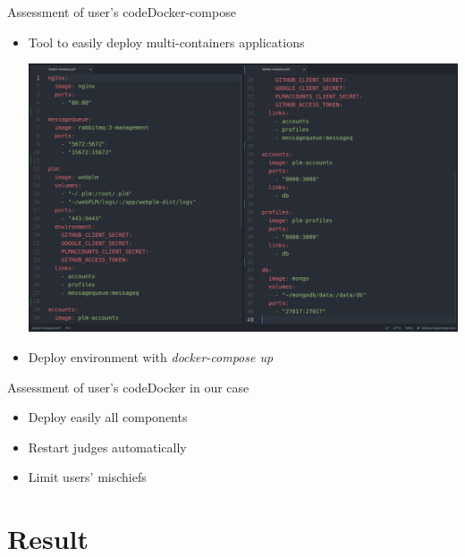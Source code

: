 \documentclass{beamer}
\begin{document}
\begin{frame}{Assessment of user's code}{Docker-compose}
  \begin{itemize}
  \item {
    Tool to easily deploy multi-containers applications
  }
  \begin{center}
    \includegraphics[scale=0.14]{img/docker-compose-2.png}
  \end{center}
  \item {
    Deploy environment with \emph{docker-compose up}
  }
  \end{itemize}
\end{frame}

\begin{frame}{Assessment of user's code}{Docker in our case}
  \begin{itemize}
  \item{
    Deploy easily all components
  }
  \item {
    Restart judges automatically
  }
  \item {
    Limit users' mischiefs
  }
  \end{itemize}
\end{frame}

\section{Result}
\end{document}
